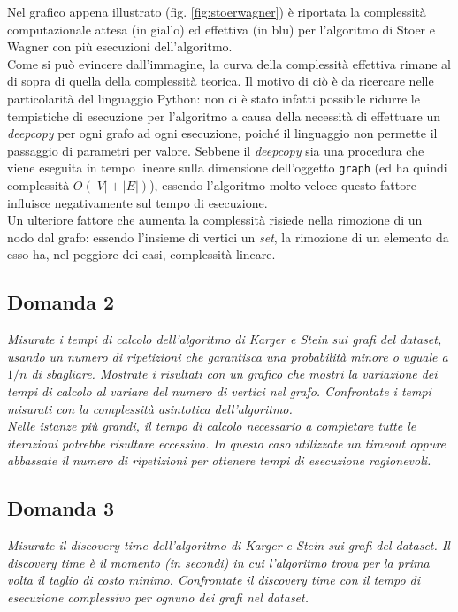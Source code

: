 Nel grafico appena illustrato (fig. \ref{fig:stoerwagner}) è riportata la complessità computazionale attesa (in giallo) ed effettiva (in blu) per l'algoritmo di Stoer e Wagner con più esecuzioni dell'algoritmo. \\
Come si può evincere dall'immagine, la curva della complessità effettiva rimane al di sopra di quella della complessità teorica. Il motivo di ciò è da ricercare nelle particolarità del linguaggio Python: non ci è stato infatti possibile ridurre le tempistiche di esecuzione per l'algoritmo a causa della necessità di effettuare un \textit{deepcopy} per ogni grafo ad ogni esecuzione, poiché il linguaggio non permette il passaggio di parametri per valore. Sebbene il \textit{deepcopy} sia una procedura che viene eseguita in tempo lineare sulla dimensione dell'oggetto \texttt{graph} (ed ha quindi complessità $O(|V|+|E|)$), essendo l'algoritmo molto veloce questo fattore influisce negativamente sul tempo di esecuzione. \\
Un ulteriore fattore che aumenta la complessità risiede nella rimozione di un nodo dal grafo: essendo l'insieme di vertici un \textit{set}, la rimozione di un elemento da esso ha, nel peggiore dei casi, complessità lineare.

\subsection{Domanda 2}
\textit{Misurate i tempi di calcolo dell'algoritmo di Karger e Stein sui grafi del dataset, usando un numero di ripetizioni che garantisca una probabilità minore o uguale a $1/n$ di sbagliare. Mostrate i risultati con un grafico che mostri la variazione dei tempi di calcolo al variare del numero di vertici nel grafo. Confrontate i tempi misurati con la complessità asintotica dell'algoritmo. \\
Nelle istanze più grandi, il tempo di calcolo necessario a completare tutte le iterazioni potrebbe risultare eccessivo. In questo caso utilizzate un timeout oppure abbassate il numero di ripetizioni per ottenere tempi di esecuzione ragionevoli.}

\subsection{Domanda 3}
\textit{Misurate il discovery time dell'algoritmo di Karger e Stein sui grafi del dataset. Il discovery time è il momento (in secondi) in cui l'algoritmo trova per la prima volta il taglio di costo minimo.  Confrontate il discovery time con il tempo di esecuzione complessivo per ognuno dei grafi nel dataset.}

